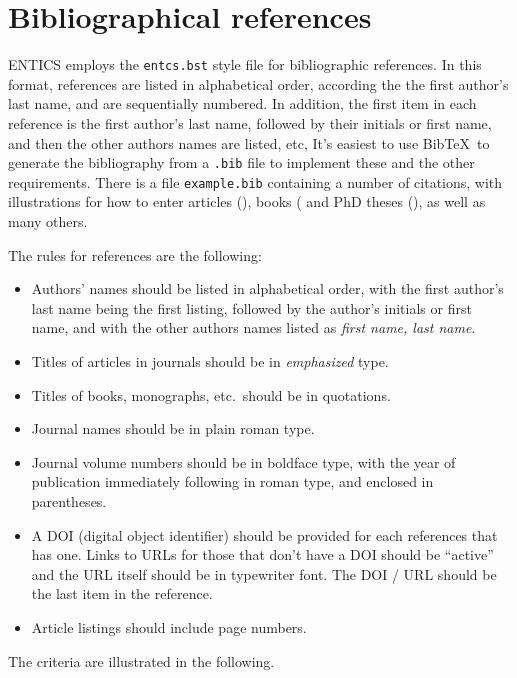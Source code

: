 \documentclass[twoside,11pt]{entics}
\begin{document}
\section{Bibliographical references}\label{references}
ENTICS employs the \texttt{entcs.bst} style file for bibliographic references.
In this format, references are listed in alphabetical order, according the the
first author's last name, and are sequentially numbered. In addition, the first
item in each reference is the first author's last name, followed by their
initials or first name, and then the other authors names are listed, etc, It's
easiest to use Bib\TeX\ to generate the bibliography from a \verb+.bib+ file to
implement these and the other requirements. There is a file
\texttt{example.bib} containing a number of citations, with illustrations for
how to enter articles (\cite{Civin-Yood,Freyd,Easdown-Munn}), books
(\cite{Roscoe,Clifford-Preston,Weyl} and PhD theses (\cite{Shehadah}), as well
as many others.

The rules for references are the following:
\begin{itemize}
  \item Authors' names should be listed in alphabetical order, with the first author's
        last name being the first listing, followed by the author's initials or first
        name, and with the other authors names listed as \emph{first name, last name}.
  \item Titles of articles in journals should be in \emph{emphasized} type.
  \item Titles of books, monographs, etc.\ should be in quotations.
  \item Journal names should be in plain roman type.
  \item Journal volume numbers should be in boldface type, with the year of publication
        immediately following in roman type, and enclosed in parentheses.
  \item A DOI (digital object identifier) should be provided for each references that
        has one. Links to URLs for those that don't have a DOI should be ``active'' and
        the URL itself should be in typewriter font. The DOI / URL should be the last
        item in the reference.
  \item Article listings should include page numbers.
\end{itemize}
The criteria are illustrated in the following.
\end{document}
